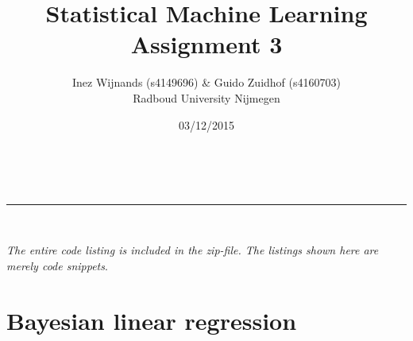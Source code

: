 \documentclass[a4paper,10pt]{article}
\makeatletter
\numberwithin{equation}{section} %
\numberwithin{figure}{section} %
\numberwithin{table}{section} %
\newcommand{\linia}{\rule{\linewidth}{0.5pt}}
\theoremstyle{mytheor}
\renewcommand{\maketitle}{
\begin{center}
\vspace{2ex}
{\huge \textsc{\@title}}
\vspace{1ex}
\\
\linia\\
\@author  \@date
\vspace{4ex}
\end{center}
}
\makeatother
\begin{document}
\title{Statistical Machine Learning \\ Assignment 3}

\author{Inez Wijnands (s4149696) \& Guido Zuidhof (s4160703)\\ Radboud University Nijmegen\\}

\date{03/12/2015}

\maketitle

\noindent \textit{The entire code listing is included in the zip-file. The listings shown here are merely code snippets}.\vspace{-0.5cm}
\section{Bayesian linear regression}
\end{document}
